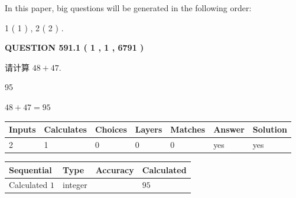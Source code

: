 \documentclass{ctexart}
\begin{document}
   
   
\vspace{0.2in}
   
In this paper, big questions will be generated in the following order: 
   
   
   1 ( 1 )
 ,
   2 ( 2 )
 .
  
\vspace{0.2in}
  
{\textbf{\Large{QUESTION
591.1 
 ( 1 , 1 , 6791 )
}}}
  
  
 
请计算 $ %
48 +  %
47 $.
 
 
 
\noindent{}
 
 

95
 
 
\noindent{}
 
 

 
 
 
\noindent{}
 
 

$ %
48 +  %
47=   %
95$
 
 
\noindent{}
 
 

 
   
   
   
   
\noindent\begin{tabular}{|l|l|l|l|l|l|l|}
 \hline
Inputs & Calculates & Choices & Layers & Matches & Answer & Solution \\ \hline
 2  & 
 1  & 
 0
  & 
 0  & 
 0  & 
  yes & 
  yes 
  \\ \hline
 \end{tabular}
   
   
   
   
\noindent{}
   
   
  
  
\noindent\begin{tabular}{|l|l|l|l|}
\hline
 Sequential & Type & Accuracy & Calculated \\ 
\hline
 
 
  Calculated $  1 $ & integer &  & 
  $ 95 $ 
 \\  \hline  
 \end{tabular}
   
\end{document}
